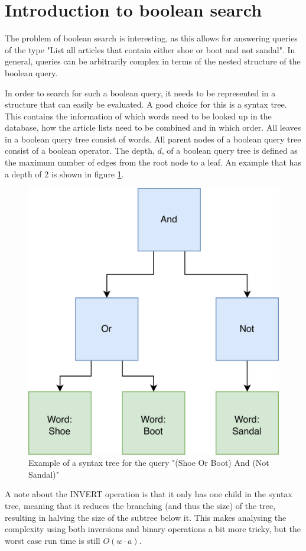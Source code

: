 \section{Introduction to boolean search}

The problem of boolean search is interesting, as this allows for answering queries of the type "List all articles that contain either shoe or boot and not sandal". In general, queries can be arbitrarily complex in terms of the nested structure of the boolean query. 

In order to search for such a boolean query, it needs to be represented in a structure that can easily be evaluated. A good choice for this is a syntax tree. This contains the information of which words need to be looked up in the database, how the article lists need to be combined and in which order. All leaves in a boolean query tree consist of words. All parent nodes of a boolean query tree consist of a boolean operator. The depth, $d$, of a boolean query tree is defined as the maximum number of edges from the root node to a leaf. An example that has a depth of 2 is shown in figure \ref{fig:bool-st-example}.

\begin{figure}[ht!]
    \centering
    \includegraphics[width=.5\textwidth]{LaTeX/Figures/BooleanST.png}
    \caption{Example of a syntax tree for the query "(Shoe Or Boot) And (Not Sandal)"}
    \label{fig:bool-st-example}
\end{figure}

A note about the INVERT operation is that it only has one child in the syntax tree, meaning that it reduces the branching (and thus the size) of the tree, resulting in halving the size of the subtree below it. This makes analysing the complexity using both inversions and binary operations a bit more tricky, but the worst case run time is still $O(w\cdot a)$. 

